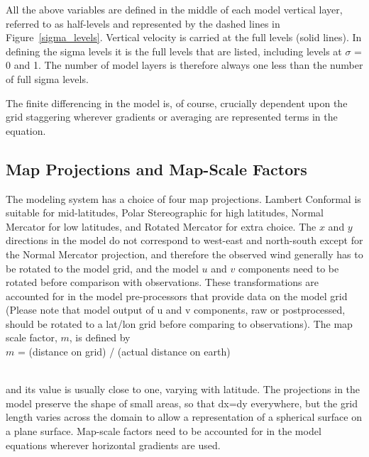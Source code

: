 All the above variables are defined in the middle of each model vertical layer,
referred to as half-levels and represented by the dashed lines in
Figure~\ref{sigma_levels}. Vertical velocity is carried at the full levels
(solid lines). In defining the sigma levels it is the full levels that are
listed, including levels at $\sigma$ = 0 and 1. The number of model layers is
therefore always one less than the number of full sigma levels.

The finite differencing in the model is, of course, crucially dependent upon the
grid staggering wherever gradients or averaging are represented terms in the
equation.

\subsection{Map Projections and Map-Scale Factors} The modeling system has a
choice of four map projections. Lambert Conformal is suitable for mid-latitudes,
Polar Stereographic for high latitudes, Normal Mercator for low latitudes, and
Rotated Mercator for extra choice. The $x$ and $y$ directions in the model do
not correspond to west-east and north-south except for the Normal Mercator
projection, and therefore the observed wind generally has to be rotated to the
model grid, and the model $u$ and $v$ components need to be rotated before
comparison with observations. These transformations are accounted for in the
model pre-processors that provide data on the model grid (Please note that
model output of u and v components, raw or postprocessed, should be rotated to a
lat/lon grid before comparing to observations).  The map scale factor, $m$, is
defined by \\

$m$ = (distance on grid) / (actual distance on earth)

\noindent \\ and its value is usually close to one, varying with latitude. The
projections in the model preserve the shape of small areas, so that dx=dy
everywhere, but the grid length varies across the domain to allow a
representation of a spherical surface on a plane surface. Map-scale factors need
to be accounted for in the model equations wherever horizontal gradients are
used.


